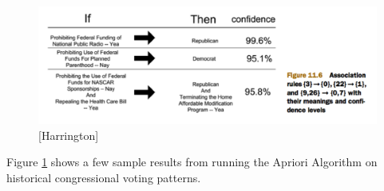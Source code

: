 \documentclass[a4paper]{article}
\begin{document}
\begin{figure}
\centering
\includegraphics[width=1.0\textwidth]{CongressionalRuleExample.png}
\caption{\label{fig:congressional}[Harrington] }
\end{figure}

Figure \ref{fig:congressional} shows a few sample results from running the Apriori Algorithm on historical congressional voting patterns.
\end{document}
